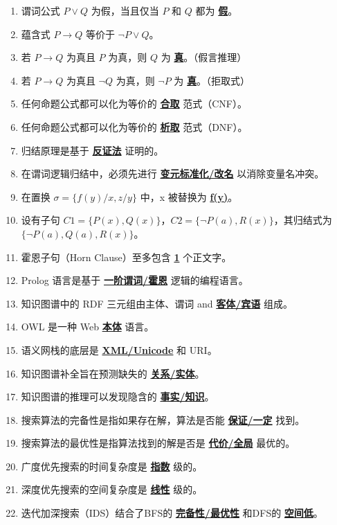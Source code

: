 \documentclass[12pt,a4paper,openany]{ctexbook}
\begin{document}
\begin{enumerate}[resume,leftmargin=2em,itemsep=1pt]
\item 谓词公式 $P \lor Q$ 为假，当且仅当 $P$ 和 $Q$ 都为 \underline{\textbf{假}}。
\item 蕴含式 $P \to Q$ 等价于 \underline{\textbf{$\neg P \lor Q$}}。
\item 若 $P \to Q$ 为真且 $P$ 为真，则 $Q$ 为 \underline{\textbf{真}}。（假言推理）
\item 若 $P \to Q$ 为真且 $\neg Q$ 为真，则 $\neg P$ 为 \underline{\textbf{真}}。（拒取式）
\item 任何命题公式都可以化为等价的 \underline{\textbf{合取}} 范式（CNF）。
\item 任何命题公式都可以化为等价的 \underline{\textbf{析取}} 范式（DNF）。
\item 归结原理是基于 \underline{\textbf{反证法}} 证明的。
\item 在谓词逻辑归结中，必须先进行 \underline{\textbf{变元标准化/改名}} 以消除变量名冲突。
\item 在置换 $\sigma = \{f(y)/x, z/y\}$ 中，x 被替换为 \underline{\textbf{f(y)}}。
\item 设有子句 $C1=\{P(x), Q(x)\}$，$C2=\{\neg P(a), R(x)\}$，其归结式为 \underline{\textbf{$\{\neg P(a), Q(a), R(x)\}$}}。
\item 霍恩子句（Horn Clause）至多包含 \underline{\textbf{1}} 个正文字。
\item Prolog 语言是基于 \underline{\textbf{一阶谓词/霍恩}} 逻辑的编程语言。
\item 知识图谱中的 RDF 三元组由主体、谓词 and \underline{\textbf{客体/宾语}} 组成。
\item OWL 是一种 Web \underline{\textbf{本体}} 语言。
\item 语义网栈的底层是 \underline{\textbf{XML/Unicode}} 和 URI。
\item 知识图谱补全旨在预测缺失的 \underline{\textbf{关系/实体}}。
\item 知识图谱的推理可以发现隐含的 \underline{\textbf{事实/知识}}。
\item 搜索算法的完备性是指如果存在解，算法是否能 \underline{\textbf{保证/一定}} 找到。
\item 搜索算法的最优性是指算法找到的解是否是 \underline{\textbf{代价/全局}} 最优的。
\item 广度优先搜索的时间复杂度是 \underline{\textbf{指数}} 级的。
\item 深度优先搜索的空间复杂度是 \underline{\textbf{线性}} 级的。
\item 迭代加深搜索（IDS）结合了BFS的 \underline{\textbf{完备性/最优性}} 和DFS的 \underline{\textbf{空间低}}。

\end{enumerate}
\end{document}
